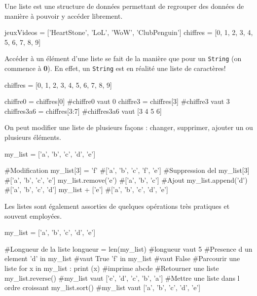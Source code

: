 Une liste est une structure de données permettant de regrouper des données de manière à pouvoir y accéder librement.

\begin{python}[caption = Exemples de listes]
jeuxVideos = ['HeartStone', 'LoL', 'WoW', 'ClubPenguin']
chiffres = [0, 1, 2, 3, 4, 5, 6, 7, 8, 9]
\end{python}

Accéder à un élément d'une liste se fait de la manière que pour un \texttt{String} (on commence à \textbf{0}).
En effet, un \texttt{String} est en réalité une liste de caractères!

\begin{python}[caption = Accès à une liste]
chiffres = [0, 1, 2, 3, 4, 5, 6, 7, 8, 9]

chiffre0 = chiffres[0]      #chiffre0 vaut 0
chiffre3 = chiffres[3]      #chiffre3 vaut 3
chiffres3a6 = chiffres[3:7] #chiffres3a6 vaut [3 4 5 6]
\end{python}

On peut modifier une liste de plusieurs façons : changer, supprimer, ajouter un ou plusieurs éléments.

\begin{python}[caption = Modification de liste]
my_list = ['a', 'b', 'c', 'd', 'e']

#Modification
my_list[3] = 'f'    #['a', 'b', 'c', 'f', 'e']
#Suppression
del my_list[3]      #['a', 'b', 'c', 'e']
my_list.remove('e') #['a', 'b', 'c']
#Ajout
my_list.append('d') #['a', 'b', 'c', 'd']
my_list + ['e']     #['a', 'b', 'c', 'd', 'e']
\end{python}

Les listes sont également assorties de quelques opérations très pratiques et souvent employées.

\begin{python}[caption = Opérations sur les listes]
my_list = ['a', 'b', 'c', 'd', 'e']

#Longueur de la liste
longueur = len(my_list)  #longueur vaut 5
#Presence d un element
'd' in my_list #vaut True 
'f' in my_list #vaut False
#Parcourir une liste
for x in my_list : print (x) #imprime abcde
#Retourner une liste
my_list.reverse() #my_list vaut ['e', 'd', 'c', 'b', 'a']
#Mettre une liste dans l ordre croissant
my_list.sort() #my_list vaut ['a', 'b', 'c', 'd', 'e']
\end{python}